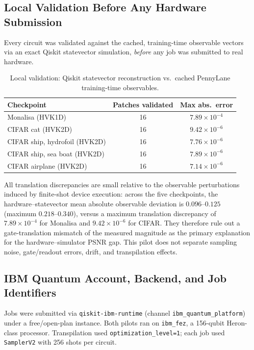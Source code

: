 \documentclass[11pt]{article}
\begin{document}
\subsection{Local Validation Before Any Hardware Submission}
Every circuit was validated against the cached, training-time observable vectors via an exact Qiskit statevector simulation, \emph{before} any job was submitted to real hardware.

\begin{table}[H]
\centering
\caption{Local validation: Qiskit statevector reconstruction vs.\ cached PennyLane training-time observables.}
\begin{tabular}{lcc}
\toprule
Checkpoint & Patches validated & Max abs.\ error \\
\midrule
Monalisa (HVK1D) & 16 & $7.89\times10^{-4}$ \\
CIFAR cat (HVK2D) & 16 & $9.42\times10^{-6}$ \\
CIFAR ship, hydrofoil (HVK2D) & 16 & $7.76\times10^{-6}$ \\
CIFAR ship, sea boat (HVK2D) & 16 & $7.89\times10^{-6}$ \\
CIFAR airplane (HVK2D) & 16 & $7.14\times10^{-6}$ \\
\bottomrule
\end{tabular}
\end{table}

All translation discrepancies are small relative to the observable perturbations induced by finite-shot device execution: across the five checkpoints, the hardware--statevector mean absolute observable deviation is $0.096$--$0.125$ (maximum $0.218$--$0.340$), versus a maximum translation discrepancy of $7.89\times10^{-4}$ for Monalisa and $9.42\times10^{-6}$ for CIFAR. They therefore rule out a gate-translation mismatch of the measured magnitude as the primary explanation for the hardware--simulator PSNR gap. This pilot does not separate sampling noise, gate/readout errors, drift, and transpilation effects.

\subsection{IBM Quantum Account, Backend, and Job Identifiers}
Jobs were submitted via \texttt{qiskit-ibm-runtime} (channel \texttt{ibm\_quantum\_platform}) under a free/open-plan instance. Both pilots ran on \texttt{ibm\_fez}, a 156-qubit Heron-class processor. Transpilation used \texttt{optimization\_level=1}; each job used \texttt{SamplerV2} with 256 shots per circuit.
\end{document}
